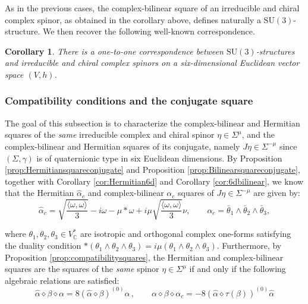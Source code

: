 \documentclass[10pt,a4paper,twoside,reqno]{amsart}
\theoremstyle{plain}
\newtheorem{cor}[thm]{Corollary}
\theoremstyle{definition}
\theoremstyle{remark}
\def\C{\mathbb{C}}
\def\SU{\mathrm{SU}}
\newcommand{\escal}[1]{\langle#1\rangle}
\begin{document}
\noindent
As in the previous cases, the complex-bilinear square of an irreducible and chiral complex spinor, as obtained in the corollary above, defines naturally a $\SU(3)$-structure. We then recover the following well-known correspondence.  

\begin{cor}
There is a one-to-one correspondence between $\SU(3)$-structures and irreducible and chiral complex spinors on a six-dimensional Euclidean vector space $(V,h)$.
\end{cor}


\subsubsection{Compatibility conditions and the conjugate square}


The goal of this subsection is to characterize the complex-bilinear and Hermitian squares of the \emph{same} irreducible complex and chiral spinor $\eta\in\Sigma^\mu$, and the complex-bilinear and Hermitian squares of its conjugate, namely $J\eta\in\Sigma^{-\mu}$ since $(\Sigma,\gamma)$ is of quaternionic type in six Euclidean dimensions. By Proposition \ref{prop:Hermitiansquareconjugate} and Proposition \ref{prop:Bilinearsquareconjugate}, together with Corollary \ref{cor:Hermitian6d} and Corollary \ref{cor:6dbilinear}, we know that the Hermitian $\widehat{\alpha}_c$ and complex-bilinear $\alpha_c$ squares of $J\eta\in\Sigma^{-\mu}$ are given by:
\begin{equation*}
\widehat{\alpha}_c = \sqrt{\frac{\escal{\omega,\omega}}{3}} - i\omega - \mu*\omega + i\mu\sqrt{\frac{\escal{\omega,\omega}}{3}}\nu,\qquad \alpha_c = \bar\theta_1\wedge\bar\theta_2\wedge\bar\theta_3,
\end{equation*}

\noindent
where $\theta_1,\theta_2,\theta_3\in V^*_\C$ are isotropic and orthogonal complex one-forms satisfying the duality condition $*(\theta_1\wedge\theta_2\wedge\theta_3)=i\mu(\theta_1\wedge\theta_2\wedge\theta_3)$. Furthermore, by Proposition \ref{prop:compatibilitysquares}, the Hermitian and complex-bilinear squares are the squares of the \emph{same} spinor $\eta\in\Sigma^{\mu}$ if and only if the following algebraic relations are satisfied:
\begin{equation*}  
\widehat{\alpha} \diamond \beta \diamond \alpha   = 8 (\widehat{\alpha} \diamond \beta)^{(0)} \alpha \, , \qquad   \alpha \diamond \beta \diamond \alpha_c = -  8    (\widehat{\alpha} \diamond   \tau(\beta))^{(0)} \widehat{\alpha}
\end{equation*}
\end{document}
